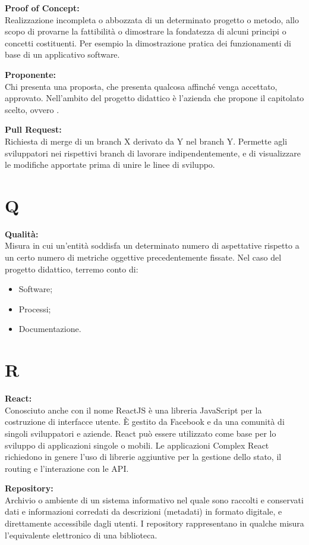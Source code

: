 \documentclass[a4paper, oneside, openany, dvipsnames, table]{article}
\begin{document}
\textbf{Proof of Concept:}\\	Realizzazione incompleta o abbozzata di un determinato progetto o metodo, allo scopo di provarne la fattibilità o dimostrare la fondatezza di alcuni principi o concetti costituenti. Per esempio la dimostrazione pratica dei funzionamenti di base di un applicativo software.

\textbf{Proponente:}\\	Chi presenta una proposta, che presenta qualcosa affinché venga accettato, approvato. Nell'ambito del progetto didattico è l'azienda che propone il capitolato scelto, ovvero \proponente.

\textbf{Pull Request:}\\	Richiesta di merge di un branch X derivato da Y nel branch Y. Permette agli sviluppatori nei rispettivi branch di lavorare indipendentemente, e di visualizzare le modifiche apportate prima di unire le linee di sviluppo.

\newpage
\section{Q}
\textbf{Qualità:}\\	Misura in cui un'entità soddisfa un determinato numero di aspettative rispetto a un certo numero di metriche oggettive precedentemente fissate. Nel caso del progetto didattico, terremo conto di:
\begin{itemize}
	\item Software;
	\item Processi;
	\item Documentazione.
\end{itemize}


\newpage
\section{R}
\textbf{React:}\\	Conosciuto anche con il nome ReactJS è una libreria JavaScript per la costruzione di interfacce utente. È gestito da Facebook e da una comunità di singoli sviluppatori e aziende. React può essere utilizzato come base per lo sviluppo di applicazioni singole o mobili. Le applicazioni Complex React richiedono in genere l'uso di librerie aggiuntive per la gestione dello stato, il routing e l'interazione con le API.
 
\textbf{Repository:}\\	Archivio o ambiente di un sistema informativo nel quale sono raccolti e conservati dati e informazioni corredati da descrizioni (metadati) in formato digitale, e direttamente accessibile dagli utenti. I repository rappresentano in qualche misura l’equivalente elettronico di una biblioteca.
\end{document}
